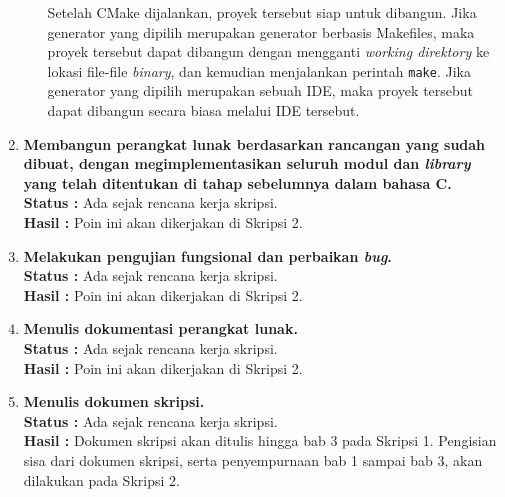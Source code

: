 \documentclass[a4paper,twoside]{article}
\begin{document}
\begin{enumerate}
\begin{enumerate}
\begin{itemize}
	\end{itemize}
	
	Setelah CMake dijalankan, proyek tersebut siap untuk dibangun. Jika generator yang dipilih merupakan generator berbasis Makefiles, maka proyek tersebut dapat dibangun dengan mengganti \textit{working direktory} ke lokasi file-file \textit{binary}, dan kemudian menjalankan perintah \verb|make|. Jika generator yang dipilih merupakan sebuah IDE, maka proyek tersebut dapat dibangun secara biasa melalui IDE tersebut.
\end{enumerate}
		

		\item \textbf{Membangun perangkat lunak berdasarkan rancangan yang sudah dibuat, dengan megimplementasikan seluruh modul dan \textit{library} yang telah ditentukan di tahap sebelumnya dalam bahasa C.}\\
		{\bf Status :} Ada sejak rencana kerja skripsi.\\
		{\bf Hasil :} Poin ini akan dikerjakan di Skripsi 2.

		\item \textbf{Melakukan pengujian fungsional dan perbaikan \textit{bug}.}\\
		{\bf Status :} Ada sejak rencana kerja skripsi.\\
		{\bf Hasil :} Poin ini akan dikerjakan di Skripsi 2.
		

		\item \textbf{Menulis dokumentasi perangkat lunak.}\\
		{\bf Status :} Ada sejak rencana kerja skripsi.\\
		{\bf Hasil :} Poin ini akan dikerjakan di Skripsi 2.

		\item \textbf{Menulis dokumen skripsi.}\\
		{\bf Status :} Ada sejak rencana kerja skripsi.\\
		{\bf Hasil :} Dokumen skripsi akan ditulis hingga bab 3 pada Skripsi 1. Pengisian sisa dari dokumen skripsi, serta penyempurnaan bab 1 sampai bab 3, akan dilakukan pada Skripsi 2.

	\end{enumerate}
\end{document}
